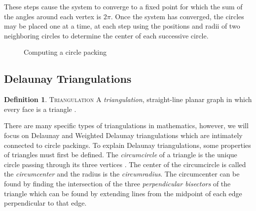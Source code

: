 \documentclass[11pt]{article}
\theoremstyle{definition}
\newtheorem{definition}{Definition}[section]
\begin{document}
	These steps cause the system to converge to a fixed point for which the sum of the angles around each vertex is $2\pi$. 
	Once the system has converged, the circles may be placed one at a time, at each step using the positions and radii of two neighboring circles to determine the center of each successive circle.

	\begin{figure}[H]%
    		\centering
    		\qquad
    		\caption{Computing a circle packing}%
    		\label{fig:inout}%
	\end{figure}

\subsection{Delaunay Triangulations}
	
	\theoremstyle{definition}
	\begin{definition}{\textsc{Triangulation}}
		A \emph{triangulation}, straight-line planar graph in which every face is a triangle \cite{meshGeneration}. 
	\end{definition}

	There are many specific types of triangulations in mathematics, however, we will focus on Delaunay and Weighted Delaunay triangulations which are intimately connected to circle packings.
	To explain Delaunay triangulations, some properties of triangles must first be defined. 
	The \emph{circumcircle} of a triangle is the unique circle passing through its three vertices \cite{mathworld:Circumcenter}. 
	The center of the circumcircle is called the \emph{circumcenter} and the radius is the \emph{circumradius}. 
	The circumcenter can be found by finding the intersection of the three \emph{perpendicular bisectors} of the triangle which can be found by extending lines from the midpoint of each edge perpendicular to that edge.
\end{document}
